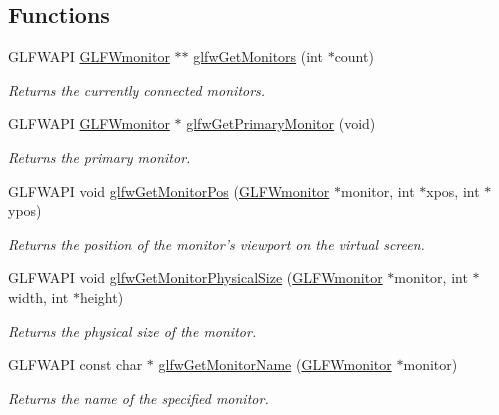 \subsection*{\-Functions}
\begin{DoxyCompactItemize}
\item 
\-G\-L\-F\-W\-A\-P\-I \hyperlink{group__monitor_ga8d9efd1cde9426692c73fe40437d0ae3}{\-G\-L\-F\-Wmonitor} $\ast$$\ast$ \hyperlink{group__monitor_gab4d483284c57e28837bc2cd9639e9665}{glfw\-Get\-Monitors} (int $\ast$count)
\begin{DoxyCompactList}\small\item\em \-Returns the currently connected monitors. \end{DoxyCompactList}\item 
\-G\-L\-F\-W\-A\-P\-I \hyperlink{group__monitor_ga8d9efd1cde9426692c73fe40437d0ae3}{\-G\-L\-F\-Wmonitor} $\ast$ \hyperlink{group__monitor_ga59ea49f377fe701dd76764183e64d9f4}{glfw\-Get\-Primary\-Monitor} (void)
\begin{DoxyCompactList}\small\item\em \-Returns the primary monitor. \end{DoxyCompactList}\item 
\-G\-L\-F\-W\-A\-P\-I void \hyperlink{group__monitor_ga45b5481a614ad7beb2aade9746d07563}{glfw\-Get\-Monitor\-Pos} (\hyperlink{group__monitor_ga8d9efd1cde9426692c73fe40437d0ae3}{\-G\-L\-F\-Wmonitor} $\ast$monitor, int $\ast$xpos, int $\ast$ypos)
\begin{DoxyCompactList}\small\item\em \-Returns the position of the monitor's viewport on the virtual screen. \end{DoxyCompactList}\item 
\-G\-L\-F\-W\-A\-P\-I void \hyperlink{group__monitor_gadb3e088860fecedda3dabfd909b4df2b}{glfw\-Get\-Monitor\-Physical\-Size} (\hyperlink{group__monitor_ga8d9efd1cde9426692c73fe40437d0ae3}{\-G\-L\-F\-Wmonitor} $\ast$monitor, int $\ast$width, int $\ast$height)
\begin{DoxyCompactList}\small\item\em \-Returns the physical size of the monitor. \end{DoxyCompactList}\item 
\-G\-L\-F\-W\-A\-P\-I const char $\ast$ \hyperlink{group__monitor_ga22f62011bae33ea8d2974eff5d14f9b8}{glfw\-Get\-Monitor\-Name} (\hyperlink{group__monitor_ga8d9efd1cde9426692c73fe40437d0ae3}{\-G\-L\-F\-Wmonitor} $\ast$monitor)
\begin{DoxyCompactList}\small\item\em \-Returns the name of the specified monitor. \end{DoxyCompactList}\item 
$$
\end{DoxyCompactItemize}
